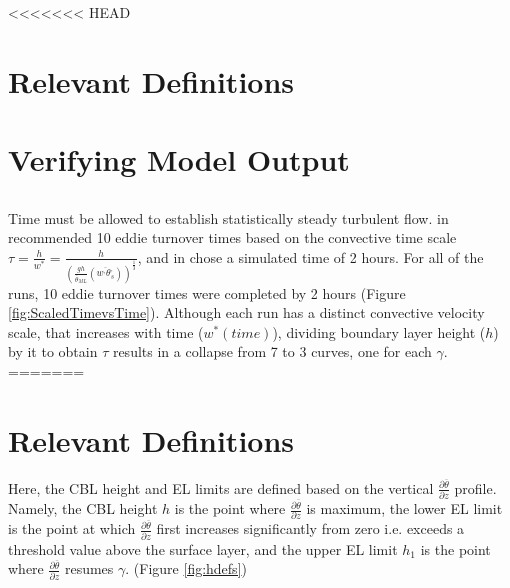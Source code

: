 <<<<<<< HEAD

\section{Relevant Definitions}


\section{Verifying Model Output}
\label{sec:CheckingtheModel}
\subsection{}%
\FloatBarrier

Time must be allowed to establish statistically steady turbulent flow.  \citeauthor{SullMoengStev} in \cite{SullMoengStev}
recommended 10 eddie turnover times based on the convective time scale $\tau = \frac{h}{w^{*}} = \frac{h}{ \left( \frac{gh}{\overline{\theta}_{ML}}(\overline{w^{,} \theta^{,}_{s}}) \right)^{\frac{1}{3}} } $, 
and \citeauthor{BrooksFowler2} in \cite{BrooksFowler2} chose a simulated time of 2 hours.  For all of the runs, 10 eddie 
turnover times were completed by 2 hours (Figure \ref{fig:ScaledTimevsTime}).  Although each run has a distinct
convective velocity scale, that increases with time ($w^{*}(time)$), dividing boundary layer height ($h$) by it
to obtain $\tau$ results in a collapse from 7 to 3 curves, one for each $\gamma$.\\
=======
\clearpage

\section{Relevant Definitions}
\FloatBarrier

Here, the \acs{CBL} height and \acs{EL} limits are defined based on the vertical  $\frac{\partial \overline{\theta}}{\partial z}$
profile.  Namely, the \acs{CBL} height $h$ is the point where  $\frac{\partial \overline{\theta}}{\partial z}$ is maximum, the 
lower \acs{EL} limit is the point at which  $\frac{\partial \overline{\theta}}{\partial z}$ first increases
significantly from zero i.e. exceeds a threshold value above the surface layer, and the upper \acs{EL} limit $h_{1}$ is the point where
$\frac{\partial \overline{\theta}}{\partial z}$ resumes $\gamma$. (Figure \ref{fig:hdefs})\\

